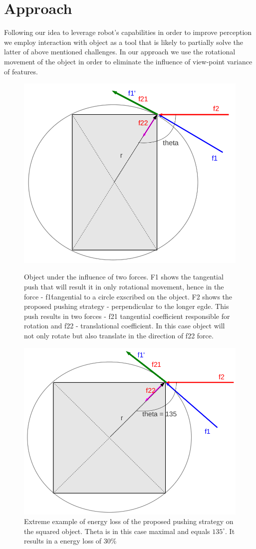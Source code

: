 \section{Approach}

Following our idea to leverage robot's capabilities in order to improve perception we employ interaction with object as a tool that is likely to partially solve the latter of above mentioned challenges. In our approach we use the rotational movement of the object in order to eliminate the influence of view-point variance of features.

\begin{figure}

\includegraphics[width=0.5\columnwidth]{figures/rectangle-angle.png}\\


\caption{Object under the influence of two forces. F1 shows the tangential push that will result it in only rotational movement, hence in the force - f1\' tangential to a circle exscribed on the object. F2 shows the proposed pushing strategy - perpendicular to the longer egde. This push results in two forces - f21 tangential coefficient responsible for rotation and f22 - translational coefficient. In this case object will not only rotate but also translate in the direction of f22 force.  }
\label{fig:angles-rectangle}
\end{figure}


\begin{figure}
 

\includegraphics[width=0.5\columnwidth]{figures/square-angle.png}


\caption{Extreme example of energy loss of the proposed pushing strategy on the squared object. Theta is in this case maximal and equals $135 ^\circ$. It results in a energy loss of 30\%  }
\label{fig:angles-square}
\end{figure}

